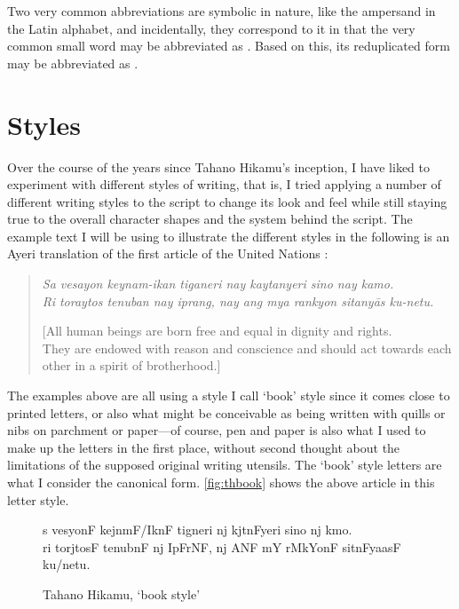 Two very common abbreviations are symbolic in nature, like the ampersand
\orth{\&} in the Latin alphabet, and incidentally, they correspond to it in
that the very common small word  may be abbreviated as
\ayr{\&}. Based on this, its reduplicated form  may be abbreviated as \ayr{+}.


\section{Styles}

Over the course of the years since Tahano Hikamu's inception, I have liked to
experiment with different styles of writing, that is, I tried applying a number
of different writing styles to the script to change its look and feel while
still staying true to the overall character shapes and the system behind the
script. The example text I will be using to illustrate the different styles in
the following is an Ayeri translation of the first article of the United
Nations  \citep{benung:udhr}:

\blockcquote[Article 1]{udhr}{\textit{Sa vesayon keynam-ikan tiganeri nay
kaytanyeri sino nay kamo.\\
Ri toraytos tenuban nay iprang, nay ang mya rankyon sitanyās ku-netu.}

[All human beings are born free and equal in dignity and rights.\\
They are endowed with reason and conscience and should act towards each other 
in a spirit of brotherhood.]}

 The examples above are all using a
style I call `book' style since it comes close to printed letters, or also what
might be conceivable as being written with quills or nibs on parchment or 
paper---of course, pen and paper is also what I used to make up the letters in
the first place, without second thought about the limitations of the supposed
original writing utensils. The `book' style letters are what I consider the
canonical form. \autoref{fig:thbook} shows the above article in this letter
style.

\begin{figure}[ht]\centering
\caption{Tahano Hikamu, `book style'}
{\Tagati\Large s vesyonF kejnmF/IknF tigneri nj kjtnFyeri sino nj kmo.\\
ri torjtosF tenubnF nj IpFrNF, nj ANF mY rMkYonF sitnFyaasF 
ku/netu.}
\label{fig:thbook}
\end{figure}

